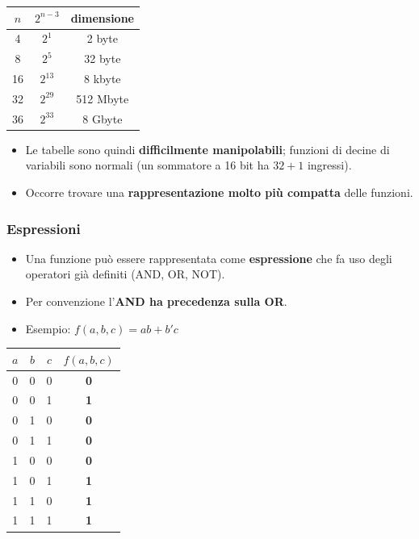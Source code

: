 \documentclass[12pt, a4paper]{article}
\begin{document}
\begin{center}
\renewcommand{\arraystretch}{1.25}
\begin{tabular}[t]{|c||c|c|}
\hline
\colorbox{gray!25}{\color{black}$n$} & \colorbox{gray!25}{\color{black}$2^{n-3}$} & \colorbox{gray!25}{\color{black}\textbf{dimensione}} \\ \hline
4 & $2^{1}$ & 2 byte \\ \hline
8 & $2^{5}$ & 32 byte \\ \hline
16 & $2^{13}$ & 8 kbyte \\ \hline
32 & $2^{29}$ & 512 Mbyte \\ \hline
36 & $2^{33}$ & 8 Gbyte \\ \hline
\end{tabular}
\end{center}

\begin{itemize}
    \item Le tabelle sono quindi \textcolor{red!80!black}{\textbf{difficilmente manipolabili}}; funzioni di decine di variabili sono normali (un sommatore a 16 bit ha $32 + 1$ ingressi).
    \item Occorre trovare una \textbf{rappresentazione molto più compatta} delle funzioni.
\end{itemize}

\subsubsection{Espressioni}
\begin{itemize}
    \item Una funzione può essere rappresentata come \textbf{espressione} che fa uso degli operatori già definiti (AND, OR, NOT).
    \item Per convenzione l'\textbf{AND ha precedenza sulla OR}.
    \item Esempio: $f(a, b, c) = ab + b'c$
\end{itemize}

\begin{center}
\renewcommand{\arraystretch}{1.25}
\begin{tabular}[t]{|ccc||c|}
\hline
\colorbox{gray!25}{\color{black}$a$} & \colorbox{gray!25}{\color{black}$b$} & \colorbox{gray!25}{\color{black}$c$} & \colorbox{gray!25}{\color{black}$f(a,b,c)$} \\ \hline
0 & 0 & 0 & \textbf{0} \\ \hline
0 & 0 & 1 & \textbf{1} \\ \hline
0 & 1 & 0 & \textbf{0} \\ \hline
0 & 1 & 1 & \textbf{0} \\ \hline
1 & 0 & 0 & \textbf{0} \\ \hline
1 & 0 & 1 & \textbf{1} \\ \hline
1 & 1 & 0 & \textbf{1} \\ \hline
1 & 1 & 1 & \textbf{1} \\ \hline
\end{tabular}
\end{center}
\end{document}
